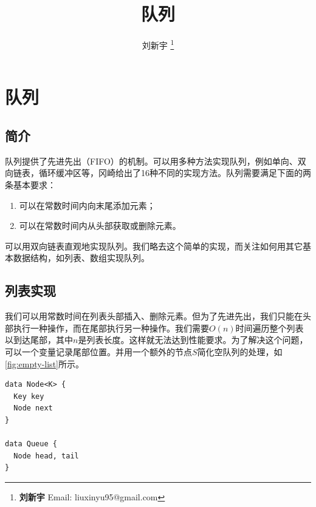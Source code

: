 \documentclass[b5paper]{ctexart}
\begin{document}
\title{队列}

\author{刘新宇
\thanks{{\bfseries 刘新宇 } \newline
  Email: liuxinyu95@gmail.com \newline}
  }

\maketitle
\fi


\ifx\wholebook\relax
\chapter{队列}
\fi

\section{简介}
\label{introduction}

队列提供了先进先出（FIFO）的机制。可以用多种方法实现队列，例如单向、双向链表，循环缓冲区等，冈崎给出了16种不同的实现方法\cite{okasaki-book}。队列需要满足下面的两条基本要求：

\begin{enumerate}
\item 可以在常数时间内向末尾添加元素；
\item 可以在常数时间内从头部获取或删除元素。
\end{enumerate}

可以用双向链表直观地实现队列。我们略去这个简单的实现，而关注如何用其它基本数据结构，如列表、数组实现队列。

\section{列表实现}

我们可以用常数时间在列表头部插入、删除元素。但为了先进先出，我们只能在头部执行一种操作，而在尾部执行另一种操作。我们需要$O(n)$时间遍历整个列表以到达尾部，其中$n$是列表长度。这样就无法达到性能要求。为了解决这个问题，可以一个变量记录尾部位置。并用一个额外的节点$S$简化空队列的处理，如\cref{fig:empty-list}所示。

\lstset{frame = single}
\begin{lstlisting}[language = Bourbaki]
data Node<K> {
  Key key
  Node next
}

data Queue {
  Node head, tail
}
\end{lstlisting}
\end{document}
